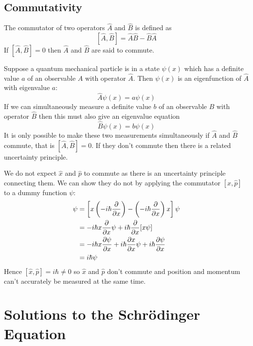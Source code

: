 \documentclass{article}
\begin{document}
    \subsection{Commutativity}
    The commutator of two operators \(\hat A\) and \(\hat B\) is defined as
    \[[\hat A, \hat B] = \hat A\hat B - \hat B\hat A\]
    If \([\hat A, \hat B] = 0\) then \(\hat A\) and \(\hat B\) are said to commute.
    
    Suppose a quantum mechanical particle is in a state \(\psi(x)\) which has a definite value \(a\) of an observable \(A\) with operator \(\hat A\).
    Then \(\psi(x)\) is an eigenfunction of \(\hat A\) with eigenvalue \(a\):
    \[\hat A\psi(x) = a\psi(x)\]
    If we can simultaneously measure a definite value \(b\) of an observable \(B\) with operator \(\hat B\) then this must also give an eigenvalue equation
    \[\hat B\psi(x) = b\psi(x)\]
    It is only possible to make these two measurements simultaneously if \(\hat A\) and \(\hat B\) commute, that is \([\hat A, \hat B] = 0\).
    If they don't commute then there is a related uncertainty principle.
    
    \example
    We do not expect \(\hat x\) and \(\hat p\) to commute as there is an uncertainty principle connecting them.
    We can show they do not by applying the commutator \([\hat x, \hat p]\) to a dummy function \(\psi\):
    \begin{align*}
        [\hat x, \hat p]\psi &= \left[x\left(-i\hbar\pdv{x}\right) - \left(-i\hbar\pdv{x}\right)x\right]\psi\\
        &= -i\hbar x\pdv{x}\psi + i\hbar \pdv{x}[x\psi]\\
        &= -i\hbar x\pdv{\psi}{x} + i\hbar \pdv{x}{x}\psi + i\hbar \pdv{\psi}{x}\\
        &= i\hbar\psi
    \end{align*}
    Hence \([\hat x, \hat p] = i\hbar \ne 0\) so \(\hat x\)  and \(\hat p\) don't commute and position and momentum can't accurately be measured at the same time.
    
    \section{Solutions to the Schr\"odinger Equation}
    
\end{document}
